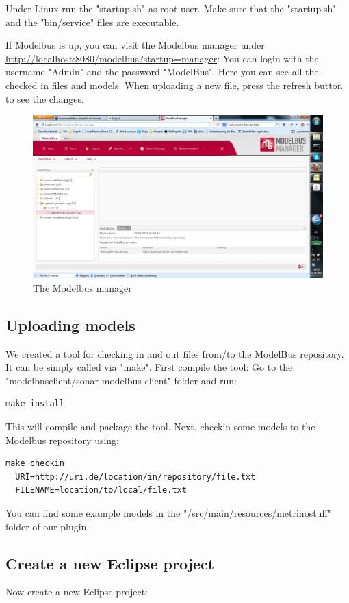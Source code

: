 Under Linux run the "startup.sh" as root user. Make sure that the "startup.sh" and the "bin/service" files are executable.

If Modelbus is up, you can visit the Modelbus manager under \url{http://localhost:8080/modelbus?startup=manager}: You can login with the username "Admin" and the password "ModelBus". Here you can see all the checked in files and models. When uploading a new file, press the refresh button to see the changes.

\begin{figure}
	\centering
		\includegraphics[width=\textwidth]{modelbusmanager}
	\caption{The Modelbus manager}
	\label{fig:modelbusmanager}
\end{figure}


\subsection{Uploading models}
We created a tool for checking in and out files from/to the ModelBus repository. It can be simply called via "make". First compile the tool: Go to the "modelbusclient/sonar-modelbus-client" folder and run:
\begin{verbatim}
make install
\end{verbatim}
This will compile and package the tool. Next, checkin some models to the Modelbus repository using:
\begin{verbatim}
make checkin 
  URI=http://uri.de/location/in/repository/file.txt 
  FILENAME=location/to/local/file.txt
\end{verbatim}
You can find some example models in the "/src/main/resources/metrinostuff" folder of our plugin.


\subsection{Create a new Eclipse project}
Now create a new Eclipse project:

